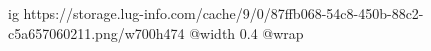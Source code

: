  
 
 
 
 

\ifcmt
  ig https://storage.lug-info.com/cache/9/0/87ffb068-54c8-450b-88c2-c5a657060211.png/w700h474
  @width 0.4
  @wrap 
\fi
